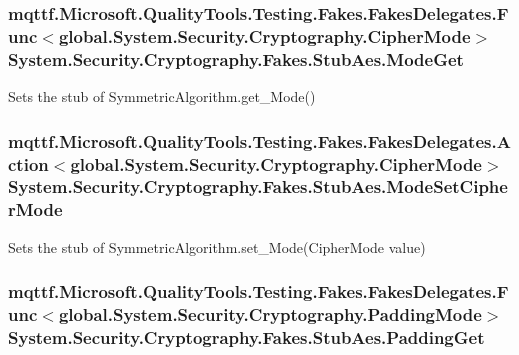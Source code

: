 \hypertarget{class_system_1_1_security_1_1_cryptography_1_1_fakes_1_1_stub_aes_a8eaceb2d756fc309664f4a184fc951a5}{
\subsubsection[{Mode\-Get}]{\setlength{\rightskip}{0pt plus 5cm}mqttf.\-Microsoft.\-Quality\-Tools.\-Testing.\-Fakes.\-Fakes\-Delegates.\-Func$<$global.\-System.\-Security.\-Cryptography.\-Cipher\-Mode$>$ System.\-Security.\-Cryptography.\-Fakes.\-Stub\-Aes.\-Mode\-Get}}\label{class_system_1_1_security_1_1_cryptography_1_1_fakes_1_1_stub_aes_a8eaceb2d756fc309664f4a184fc951a5}


Sets the stub of Symmetric\-Algorithm.\-get\-\_\-\-Mode()

\hypertarget{class_system_1_1_security_1_1_cryptography_1_1_fakes_1_1_stub_aes_a11dd9aa113dd3a0439ae00155eaff481}{
\subsubsection[{Mode\-Set\-Cipher\-Mode}]{\setlength{\rightskip}{0pt plus 5cm}mqttf.\-Microsoft.\-Quality\-Tools.\-Testing.\-Fakes.\-Fakes\-Delegates.\-Action$<$global.\-System.\-Security.\-Cryptography.\-Cipher\-Mode$>$ System.\-Security.\-Cryptography.\-Fakes.\-Stub\-Aes.\-Mode\-Set\-Cipher\-Mode}}\label{class_system_1_1_security_1_1_cryptography_1_1_fakes_1_1_stub_aes_a11dd9aa113dd3a0439ae00155eaff481}


Sets the stub of Symmetric\-Algorithm.\-set\-\_\-\-Mode(\-Cipher\-Mode value)

\hypertarget{class_system_1_1_security_1_1_cryptography_1_1_fakes_1_1_stub_aes_acffeb60c165db35d17b81bb85df2feea}{
\subsubsection[{Padding\-Get}]{\setlength{\rightskip}{0pt plus 5cm}mqttf.\-Microsoft.\-Quality\-Tools.\-Testing.\-Fakes.\-Fakes\-Delegates.\-Func$<$global.\-System.\-Security.\-Cryptography.\-Padding\-Mode$>$ System.\-Security.\-Cryptography.\-Fakes.\-Stub\-Aes.\-Padding\-Get}}\label{class_system_1_1_security_1_1_cryptography_1_1_fakes_1_1_stub_aes_acffeb60c165db35d17b81bb85df2feea}


